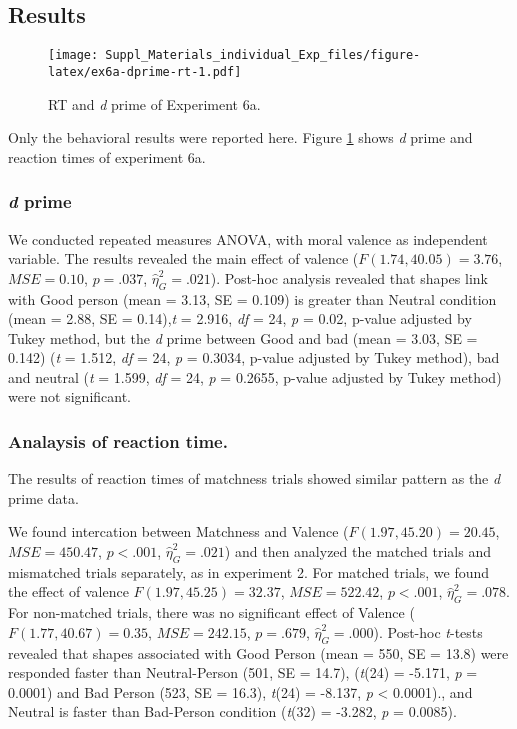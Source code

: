 \documentclass[
  english,
  man]{apa6}
\begin{document}
\hypertarget{results-9}{%
\subsection{Results}\label{results-9}}

\begin{figure}
\centering
\texttt{[image: Suppl\_Materials\_individual\_Exp\_files/figure-latex/ex6a-dprime-rt-1.pdf]}
\caption{\label{fig:ex6a-dprime-rt}RT and \emph{d} prime of Experiment 6a.}
\end{figure}

Only the behavioral results were reported here. Figure \ref{fig:ex6a-dprime-rt} shows \emph{d} prime and reaction times of experiment 6a.

\hypertarget{d-prime-6}{%
\subsubsection{\texorpdfstring{\emph{d} prime}{d prime}}\label{d-prime-6}}

We conducted repeated measures ANOVA, with moral valence as independent variable. The results revealed the main effect of valence (\(F(1.74, 40.05) = 3.76\), \(\mathit{MSE} = 0.10\), \(p = .037\), \(\hat{\eta}^2_G = .021\)). Post-hoc analysis revealed that shapes link with Good person (mean = 3.13, SE = 0.109) is greater than Neutral condition (mean = 2.88, SE = 0.14),\emph{t} = 2.916, \emph{df} = 24, \emph{p} = 0.02, p-value adjusted by Tukey method, but the \emph{d} prime between Good and bad (mean = 3.03, SE = 0.142) (\emph{t} = 1.512, \emph{df} = 24, \emph{p} = 0.3034, p-value adjusted by Tukey method), bad and neutral (\emph{t} = 1.599, \emph{df} = 24, \emph{p} = 0.2655, p-value adjusted by Tukey method) were not significant.

\hypertarget{analaysis-of-reaction-time.}{%
\subsubsection{Analaysis of reaction time.}\label{analaysis-of-reaction-time.}}

The results of reaction times of matchness trials showed similar pattern as the \emph{d} prime data.

We found intercation between Matchness and Valence (\(F(1.97, 45.20) = 20.45\), \(\mathit{MSE} = 450.47\), \(p < .001\), \(\hat{\eta}^2_G = .021\)) and then analyzed the matched trials and mismatched trials separately, as in experiment 2. For matched trials, we found the effect of valence \(F(1.97, 45.25) = 32.37\), \(\mathit{MSE} = 522.42\), \(p < .001\), \(\hat{\eta}^2_G = .078\). For non-matched trials, there was no significant effect of Valence (\(F(1.77, 40.67) = 0.35\), \(\mathit{MSE} = 242.15\), \(p = .679\), \(\hat{\eta}^2_G = .000\)). Post-hoc \emph{t}-tests revealed that shapes associated with Good Person (mean = 550, SE = 13.8) were responded faster than Neutral-Person (501, SE = 14.7), (\emph{t}(24) = -5.171, \emph{p} = 0.0001) and Bad Person (523, SE = 16.3), \emph{t}(24) = -8.137, \emph{p} \textless{} 0.0001)., and Neutral is faster than Bad-Person condition (\emph{t}(32) = -3.282, \emph{p} = 0.0085).
\end{document}
